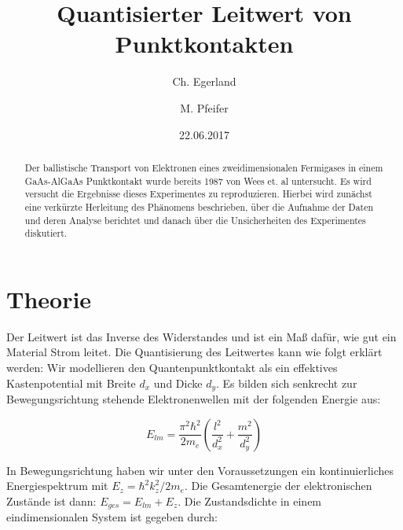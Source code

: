 \documentclass[aps,twocolumn,secnumarabic,nobalancelastpage,amsmath,amssymb,
nofootinbib,superscriptaddress]{revtex4-1}
\begin{document}
\title{Quantisierter Leitwert von Punktkontakten}
\author         {Ch. Egerland}
\author         {M. Pfeifer}
\date[Versuchsdatum: ]{22.06.2017}

\begin{abstract}
Der ballistische Transport von Elektronen eines zweidimensionalen Fermigases in einem
GaAs-AlGaAs Punktkontakt wurde bereits 1987 von Wees et. al  \cite{wees88} untersucht.
Es wird versucht die Ergebnisse dieses Experimentes zu reproduzieren. Hierbei wird
zunächst eine verkürzte Herleitung des Phänomens beschrieben, über die Aufnahme
der Daten und deren Analyse berichtet und danach über die Unsicherheiten des Experimentes
diskutiert.
\end{abstract}


\maketitle




\section{Theorie}

Der Leitwert ist das Inverse des Widerstandes und ist ein Maß dafür, wie gut ein
Material Strom leitet. Die Quantisierung des Leitwertes kann wie folgt erklärt
werden: Wir modellieren den Quantenpunktkontakt als ein effektives Kastenpotential
mit Breite $d_x$ und Dicke $d_y$. Es bilden sich senkrecht zur Bewegungsrichtung
stehende Elektronenwellen mit der folgenden Energie aus:

  \begin{equation}
    E_{lm} = \frac{\pi^2 \hbar^2}{2 m_e} \left(\frac{l^2}{d_x^2}+\frac{m^2}{d_y^2} \right)
  \end{equation}

In Bewegungsrichtung haben wir unter den Voraussetzungen ein kontinuierliches
Energiespektrum mit $E_z = \hbar^2 k_z^2 / 2m_e$. Die Gesamtenergie der elektronischen
Zustände ist dann: $E_{ges} = E_{lm} + E_z$.
Die Zustandsdichte in einem eindimensionalen System ist gegeben durch:
\end{document}
